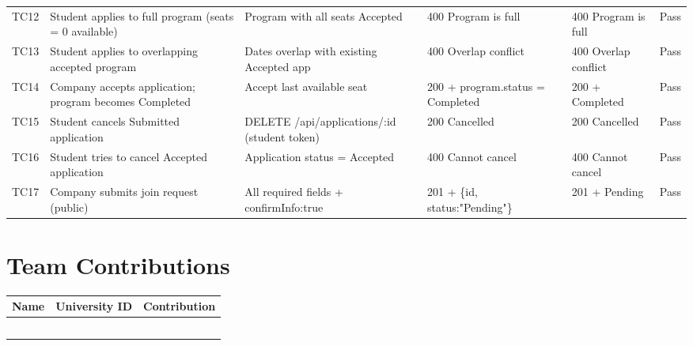 \documentclass[12pt,a4paper]{article}
\begin{document}
\begin{longtable}{p{0.8cm}p{3.4cm}p{3cm}p{2.4cm}p{2.8cm}p{2cm}}
  TC12 & Student applies to full program (seats = 0 available) &
    Program with all seats Accepted &
    400 Program is full &
    400 Program is full &
    Pass \\[4pt]

  TC13 & Student applies to overlapping accepted program &
    Dates overlap with existing Accepted app &
    400 Overlap conflict &
    400 Overlap conflict &
    Pass \\[4pt]

  TC14 & Company accepts application; program becomes Completed &
    Accept last available seat &
    200 + program.status = Completed &
    200 + Completed &
    Pass \\[4pt]

  TC15 & Student cancels Submitted application &
    DELETE /api/applications/:id (student token) &
    200 Cancelled &
    200 Cancelled &
    Pass \\[4pt]

  TC16 & Student tries to cancel Accepted application &
    Application status = Accepted &
    400 Cannot cancel &
    400 Cannot cancel &
    Pass \\[4pt]

  TC17 & Company submits join request (public) &
    All required fields + confirmInfo:true &
    201 + \{id, status:"Pending"\} &
    201 + Pending &
    Pass \\[4pt]

  \bottomrule
\end{longtable}

\newpage

\section{Team Contributions}

\begin{center}
\begin{longtable}{p{4cm}p{3cm}p{7cm}}
  \toprule
  \textbf{Name} & \textbf{University ID} & \textbf{Contribution} \\
  \midrule
  & & \\[0.6cm]
  & & \\[0.6cm]
  & & \\[0.6cm]
  & & \\[0.6cm]
  & & \\[0.6cm]
  \bottomrule
\end{longtable}
\end{center}
\end{document}
